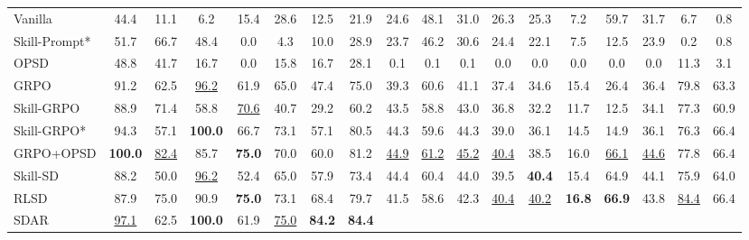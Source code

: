 \documentclass{llmxive}
\begin{document}
\begin{table}[ht!]
{\begin{tabular}{l ccccccc cccccccc cc}
    Vanilla
        & 44.4 & 11.1 & 6.2 & 15.4 & 28.6 & 12.5 & 21.9
        & 24.6 & 48.1 & 31.0 & 26.3 & 25.3 & 7.2 & 59.7 & 31.7
        & 6.7 & 0.8
        \\
    Skill-Prompt*
        & 51.7 & 66.7 & 48.4 & 0.0 & 4.3 & 10.0 & 28.9
        & 23.7 & 46.2 & 30.6 & 24.4 & 22.1 & 7.5 & 12.5 & 23.9
        & 0.2 & 0.8
        \\
    OPSD
        & 48.8 & 41.7 & 16.7 & 0.0 & 15.8 & 16.7 & 28.1
        & 0.1 & 0.1 & 0.1 & 0.0 & 0.0 & 0.0 & 0.0 & 0.0
        & 11.3 & 3.1
        \\
    GRPO
        & 91.2 & 62.5 & \cellcolor{secondcolor}\underline{96.2} & 61.9 & 65.0 & 47.4 & 75.0
        & 39.3 & 60.6 & 41.1 & 37.4 & 34.6 & 15.4 & 26.4 & 36.4
        & 79.8 & 63.3
        \\
    Skill-GRPO
        & 88.9 & 71.4 & 58.8 & \cellcolor{secondcolor}\underline{70.6} & 40.7 & 29.2 & 60.2
        & 43.5 & 58.8 & 43.0 & 36.8 & 32.2 & 11.7 & 12.5 & 34.1
        & 77.3 & 60.9
        \\
    Skill-GRPO*
        & 94.3 & 57.1 & \cellcolor{topcolor}\textbf{100.0} & 66.7 & 73.1 & 57.1 & 80.5
        & 44.3 & 59.6 & 44.3 & 39.0 & 36.1 & 14.5 & 14.9 & 36.1
        & 76.3 & 66.4
        \\
    GRPO+OPSD
        & \cellcolor{topcolor}\textbf{100.0} & \cellcolor{secondcolor}\underline{82.4} & 85.7 & \cellcolor{topcolor}\textbf{75.0} & 70.0 & 60.0 & 81.2
        & \cellcolor{secondcolor}\underline{44.9} & \cellcolor{secondcolor}\underline{61.2} & \cellcolor{secondcolor}\underline{45.2} & \cellcolor{secondcolor}\underline{40.4} & 38.5 & 16.0 & \cellcolor{secondcolor}\underline{66.1} & \cellcolor{secondcolor}\underline{44.6}
        & 77.8 & 66.4
        \\
    Skill-SD
        & 88.2 & 50.0 & \cellcolor{secondcolor}\underline{96.2} & 52.4 & 65.0 & 57.9 & 73.4
        & 44.4 & 60.4 & 44.0 & 39.5 & \cellcolor{topcolor}\textbf{40.4} & 15.4 & 64.9 & 44.1
        & 75.9 & 64.0
        \\
    RLSD
        & 87.9 & 75.0 & 90.9 & \cellcolor{topcolor}\textbf{75.0} & 73.1 & 68.4 & 79.7
        & 41.5 & 58.6 & 42.3 & \cellcolor{secondcolor}\underline{40.4} & \cellcolor{secondcolor}\underline{40.2} & \cellcolor{topcolor}\textbf{16.8} & \cellcolor{topcolor}\textbf{66.9} & 43.8
        & \cellcolor{secondcolor}\underline{84.4} & 66.4
        \\
    SDAR
        & \cellcolor{secondcolor}\underline{97.1} & 62.5 & \cellcolor{topcolor}\textbf{100.0} & 61.9 & \cellcolor{secondcolor}\underline{75.0} & \cellcolor{topcolor}\textbf{84.2} & \cellcolor{topcolor}\textbf{84.4}

\end{tabular}}
\end{table}
\end{document}
